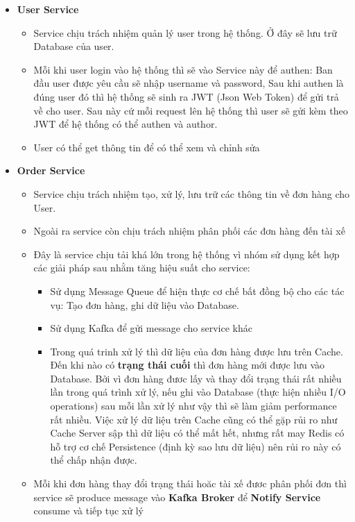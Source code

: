 		
		\begin{itemize}
			\item \textbf{User Service}
			\begin{itemize}
				\item Service chịu trách nhiệm quản lý user trong hệ thống. Ở đây sẽ lưu trữ Database của user.
				\item Mỗi khi user login vào hệ thống thì sẽ vào Service này để authen: Ban đầu user được yêu cầu sẽ nhập username và password, Sau khi authen là đúng user đó thì hệ thống sẽ sinh ra JWT (Json Web Token) để gửi trả về cho user. Sau này cứ mỗi request lên hệ thống thì user sẽ gửi kèm theo JWT để hệ thống có thể authen và author.
				\item User có thể get thông tin để có thể xem và chỉnh sửa
			\end{itemize}
			\item \textbf{Order Service}
			\begin{itemize}
				\item Service chịu trách nhiệm tạo, xử lý, lưu trữ các thông tin về đơn hàng cho User.
				\item Ngoài ra service còn chịu trách nhiệm phân phối các đơn hàng đến tài xế
				\item Đây là service chịu tải khá lớn trong hệ thống vì nhóm sử dụng kết hợp các giải pháp sau nhằm tăng hiệu suất cho service: 
					\begin{itemize}
						\item Sử dụng Message Queue để hiện thực cơ chế bất đồng bộ cho các tác vụ: Tạo đơn hàng, ghi dữ liệu vào Database.
						\item Sử dụng Kafka để gửi message cho service khác
						\item Trong quá trinh xử lý thì dữ liệu của đơn hàng được lưu trên Cache. Đến khi nào có \textbf{trạng thái cuối} thì đơn hàng mới được lưu vào Database. Bởi vì đơn hàng đươc lấy và thay đổi trạng thái rất nhiều lần trong quá trình xử lý, nếu ghi vào Database (thực hiện nhiều I/O operations) sau mỗi lần xử lý như vậy thì sẽ làm giảm performance rất nhiều. Việc xử lý dữ liệu trên Cache cũng có thể gặp rủi ro như Cache Server sập thì dữ liệu có thể mất hết, nhưng rất may Redis có hỗ trợ cơ chế Persistence (định kỳ sao lưu dữ liệu) nên rủi ro này có thể chấp nhận được.
					\end{itemize}
				\item Mỗi khi đơn hàng thay đổi trạng thái hoăc tài xế đươc phân phối đơn thì service sẽ produce message vào \textbf{Kafka Broker} để \textbf{Notify Service} consume và tiếp tục xử lý

\end{itemize}
\end{itemize}
